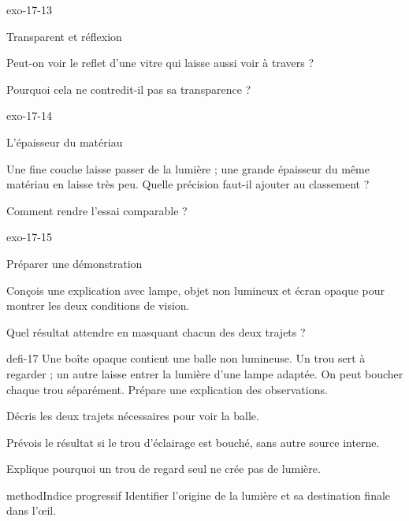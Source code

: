 \documentclass[12pt,twoside,openany]{book}
\begin{document}
\begin{blocLivre}{exo-17-13}
\begin{exercice}[3]{Transparent et réflexion}
\begin{questions}
\item Peut-on voir le reflet d’une vitre qui laisse aussi voir à travers ?
\item Pourquoi cela ne contredit-il pas sa transparence ?
\end{questions}
\end{exercice}\end{blocLivre}
\begin{blocLivre}{exo-17-14}
\begin{exercice}[3]{L’épaisseur du matériau}
\begin{questions}
\item Une fine couche laisse passer de la lumière ; une grande épaisseur du même matériau en laisse très peu. Quelle précision faut-il ajouter au classement ?
\item Comment rendre l’essai comparable ?
\end{questions}
\end{exercice}\end{blocLivre}
\begin{blocLivre}{exo-17-15}
\begin{exercice}[3]{Préparer une démonstration}
\begin{questions}
\item Conçois une explication avec lampe, objet non lumineux et écran opaque pour montrer les deux conditions de vision.
\item Quel résultat attendre en masquant chacun des deux trajets ?
\end{questions}
\end{exercice}\end{blocLivre}
\label{defi-ex-17}
\begin{pcFiche}{defi-17}
Une boîte opaque contient une balle non lumineuse. Un trou sert à regarder ; un autre laisse entrer la lumière d’une lampe adaptée. On peut boucher chaque trou séparément. Prépare une explication des observations.\par
{}
\begin{questions}
\item Décris les deux trajets nécessaires pour voir la balle.
\item Prévois le résultat si le trou d’éclairage est bouché, sans autre source interne.
\item Explique pourquoi un trou de regard seul ne crée pas de lumière.
\end{questions}
\begin{pcEncadre}{method}{Indice progressif}
Identifier l’origine de la lumière et sa destination finale dans l’œil.\par
\end{pcEncadre}
\end{pcFiche}
\end{document}
